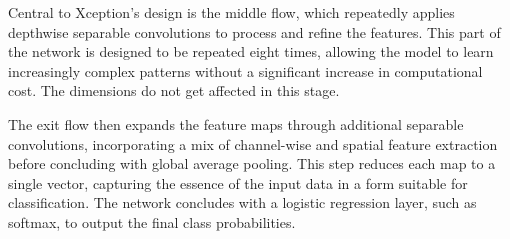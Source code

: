 Central to Xception's design is the middle flow, which repeatedly applies depthwise separable convolutions to process and refine the features. This part of the network is designed to be repeated eight times, allowing the model to learn increasingly complex patterns without a significant increase in computational cost. The dimensions do not get affected in this stage.

The exit flow then expands the feature maps through additional separable convolutions, incorporating a mix of channel-wise and spatial feature extraction before concluding with global average pooling. This step reduces each map to a single vector, capturing the essence of the input data in a form suitable for classification. The network concludes with a logistic regression layer, such as softmax, to output the final class probabilities.
